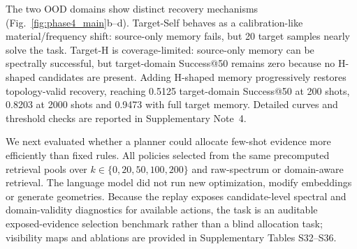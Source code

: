 \documentclass[final,1p,times]{elsarticle}
\begin{document}
The two OOD domains show distinct recovery mechanisms (Fig.~\ref{fig:phase4_main}b--d). Target-Self behaves as a calibration-like material/frequency shift: source-only memory fails, but 20 target samples nearly solve the task. Target-H is coverage-limited: source-only memory can be spectrally successful, but target-domain Success@50 remains zero because no H-shaped candidates are present. Adding H-shaped memory progressively restores topology-valid recovery, reaching 0.5125 target-domain Success@50 at 200 shots, 0.8203 at 2000 shots and 0.9473 with full target memory. Detailed curves and threshold checks are reported in Supplementary Note~4.

We next evaluated whether a planner could allocate few-shot evidence more efficiently than fixed rules. All policies selected from the same precomputed retrieval pools over \(k \in \{0,20,50,100,200\}\) and raw-spectrum or domain-aware retrieval. The language model did not run new optimization, modify embeddings or generate geometries. Because the replay exposes candidate-level spectral and domain-validity diagnostics for available actions, the task is an auditable exposed-evidence selection benchmark rather than a blind allocation task; visibility maps and ablations are provided in Supplementary Tables S32--S36.
\end{document}
